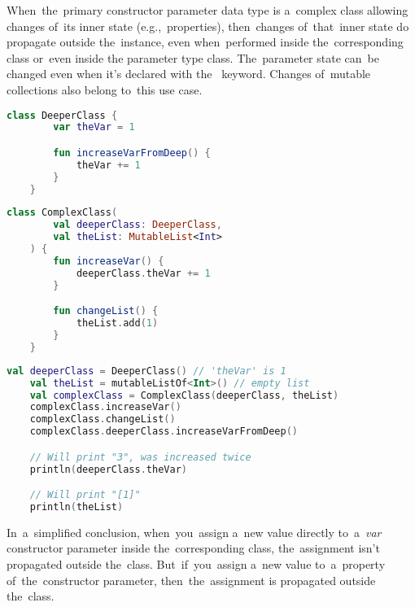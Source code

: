 \warning When~the~primary constructor parameter data type is a~complex class allowing changes of~its inner state (e.g.,~properties), then~changes of~that~inner state do propagate outside the~instance, even when~performed inside the~corresponding class or~even inside the parameter type class.
The~parameter state can~be changed even when it's declared with the~ keyword.
Changes of~mutable collections also belong to~this use case.

\example
\begin{lstlisting}[language=Kotlin, title={Class to be a type of a constructor parameter}]
    class DeeperClass {
        var theVar = 1

        fun increaseVarFromDeep() {
            theVar += 1
        }
    }
\end{lstlisting}
\begin{lstlisting}[language=Kotlin, title={Class with complex parameters in the primary constructor}]
    class ComplexClass(
        val deeperClass: DeeperClass,
        val theList: MutableList<Int>
    ) {
        fun increaseVar() {
            deeperClass.theVar += 1
        }

        fun changeList() {
            theList.add(1)
        }
    }
\end{lstlisting}
\newpage

\begin{lstlisting}[language=Kotlin, title={Behavior}]
    val deeperClass = DeeperClass() // 'theVar' is 1
    val theList = mutableListOf<Int>() // empty list
    val complexClass = ComplexClass(deeperClass, theList)
    complexClass.increaseVar()
    complexClass.changeList()
    complexClass.deeperClass.increaseVarFromDeep()

    // Will print "3", was increased twice
    println(deeperClass.theVar)

    // Will print "[1]"
    println(theList)
\end{lstlisting}
\newline

\noindent In~a~simplified conclusion, when~you~assign a~new value directly to~a~\textit{var} constructor parameter inside the~corresponding class, the~assignment isn't propagated outside the~class.
But~if~you~assign a~new value to~a~property of~the~constructor parameter, then~the~assignment is propagated outside the~class.
\newline

